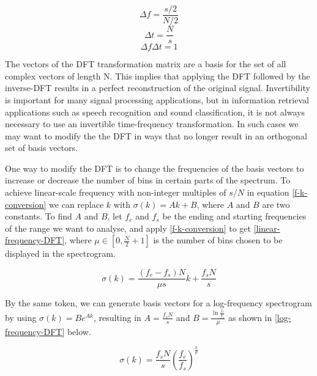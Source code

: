 \documentclass{ieeeaccess}
\begin{document}
\begin{equation}
 \Delta f = \frac{s/2}{N/2} \label{freq-resolution}
\end{equation}
\begin{equation}
 \Delta t = \frac{N}{s} \label{time-resolution}
\end{equation}
\begin{equation}
 \Delta f\Delta t = 1 \label{freq-time-resolution}
\end{equation}


The vectors of the DFT transformation matrix are a basis for the set of all complex vectors of length N. This implies that applying the DFT followed by the inverse-DFT results in a perfect reconstruction of the original signal. Invertibility is important for many signal processing applications, but in information retrieval applications such as speech recognition and sound classification, it is not always necessary to use an invertible time-frequency transformation. In such cases we may want to modify the the DFT in ways that no longer result in an orthogonal set of basis vectors.

 
One way to modify the DFT is to change the frequencies of the basis vectors to increase or decrease the number of bins in certain parts of the spectrum. To achieve linear-scale frequency with non-integer multiples of $s/N$ in equation \eqref{f-k-conversion} we can replace $k$ with $\sigma(k) = Ak + B$, where $A$ and $B$ are two constants. To find $A$ and $B$, let $f_e$ and $f_s$ be the ending and starting frequencies of the range we want to analyse, and apply \eqref{f-k-conversion} to get \eqref{linear-frequency-DFT}, where $\mu \in \left[0, \frac{N}{2}+1 \right]$ is the number of bins chosen to be displayed in the spectrogram.

\begin{equation}
 \sigma(k) = \frac{(f_e-f_s)N}{\mu s}k + \frac{f_s N}{s}\label{linear-frequency-DFT}
\end{equation}


By the same token, we can generate basis vectors for a log-frequency spectrogram by using $\sigma(k) = Be^{Ak}$, resulting in $A=\frac{f_sN}{s}$ and $B=\frac{\ln{\frac{f_e}{f_s}}}{\mu}$ as shown in \eqref{log-frequency-DFT} below.


\begin{equation}
 \sigma(k) = \frac{f_s N}{s}\left(\frac{f_e}{f_s}\right)^\frac{k}{\mu} \label{log-frequency-DFT}
\end{equation}
\end{document}
